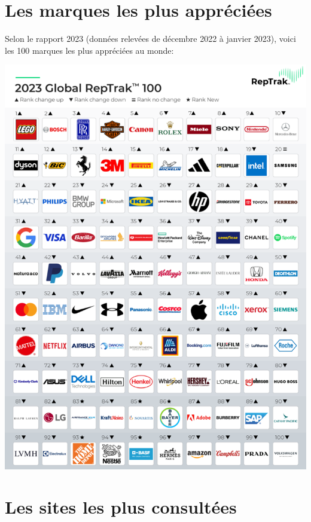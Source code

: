 \documentclass[12pt, a4paper]{report}
\begin{document}

\newpage
\section{Les marques les plus appréciées}

Selon le rapport 2023 (données relevées de décembre 2022 à janvier 2023), voici les 100 marques les plus appréciées au monde:

\begin{center}
    \includegraphics[scale=.85]{assets/images/reptrak-top-100.png}
\end{center}

\section{Les sites les plus consultées}
\end{document}
